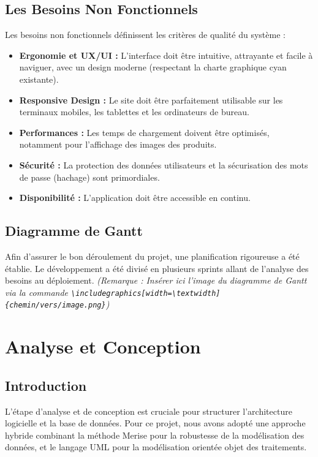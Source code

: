 \documentclass[12pt,a4paper]{report}
\begin{document}
\section{Les Besoins Non Fonctionnels}
Les besoins non fonctionnels définissent les critères de qualité du système :
\begin{itemize}
    \item \textbf{Ergonomie et UX/UI :} L'interface doit être intuitive, attrayante et facile à naviguer, avec un design moderne (respectant la charte graphique cyan existante).
    \item \textbf{Responsive Design :} Le site doit être parfaitement utilisable sur les terminaux mobiles, les tablettes et les ordinateurs de bureau.
    \item \textbf{Performances :} Les temps de chargement doivent être optimisés, notamment pour l'affichage des images des produits.
    \item \textbf{Sécurité :} La protection des données utilisateurs et la sécurisation des mots de passe (hachage) sont primordiales.
    \item \textbf{Disponibilité :} L'application doit être accessible en continu.
\end{itemize}

\section{Diagramme de Gantt}
Afin d'assurer le bon déroulement du projet, une planification rigoureuse a été établie. Le développement a été divisé en plusieurs sprints allant de l'analyse des besoins au déploiement. \textit{(Remarque : Insérer ici l'image du diagramme de Gantt via la commande \texttt{\textbackslash includegraphics[width=\textbackslash textwidth]\{chemin/vers/image.png\}})}

\chapter{Analyse et Conception}

\section{Introduction}
L'étape d'analyse et de conception est cruciale pour structurer l'architecture logicielle et la base de données. Pour ce projet, nous avons adopté une approche hybride combinant la méthode Merise pour la robustesse de la modélisation des données, et le langage UML pour la modélisation orientée objet des traitements.
\end{document}
